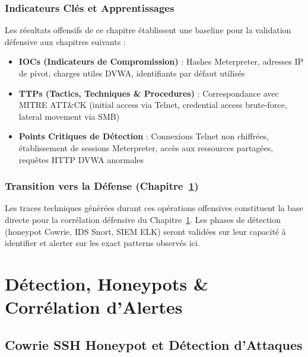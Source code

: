 \documentclass[12pt,a4paper,openany]{report}
\begin{document}
	\subsection{Indicateurs Clés et Apprentissages}
	
	Les résultats offensifs de ce chapitre établissent une baseline pour la validation défensive aux chapitres suivants :
	\begin{itemize}
		\item \textbf{IOCs (Indicateurs de Compromission)} : Hashes Meterpreter, adresses IP de pivot, charges utiles DVWA, identifiants par défaut utilisés
		\item \textbf{TTPs (Tactics, Techniques \& Procedures)} : Correspondance avec MITRE ATT\&CK (initial access via Telnet, credential access brute-force, lateral movement via SMB)
		\item \textbf{Points Critiques de Détection} : Connexions Telnet non chiffrées, établissement de sessions Meterpreter, accès aux ressources partagées, requêtes HTTP DVWA anormales
	\end{itemize}
	
	\subsection{Transition vers la Défense (Chapitre~\ref{chap:detection})}
	
	Les traces techniques générées durant ces opérations offensives constituent la base directe pour la corrélation défensive du Chapitre~\ref{chap:detection}. Les phases de détection (honeypot Cowrie, IDS Snort, SIEM ELK) seront validées sur leur capacité à identifier et alerter sur les exact patterns observés ici.
	
	\chapter{Détection, Honeypots \& Corrélation d'Alertes}
	\label{chap:detection}
	\label{chap:cowrie}
	\label{chap:snort}
	\label{chap:elk}
	
	\section{Cowrie SSH Honeypot et Détection d'Attaques}
	\label{sec:cowrie}
	
\end{document}
